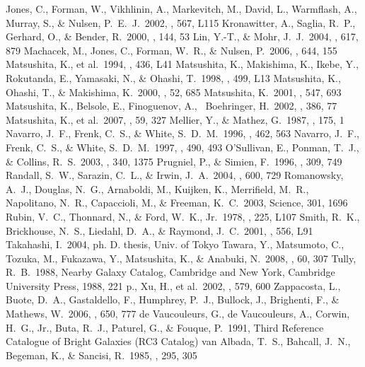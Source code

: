 \documentclass[structabstract]{aa}
\begin{document}
\begin{thebibliography}{}
 Jones, C., Forman, W., Vikhlinin, A., Markevitch, M., David, L., Warmflash, A., Murray, S., \& Nulsen, P.~E.~J.\ 2002, \apjl, 567, L115
 Kronawitter, A., Saglia, R.~P., Gerhard, O., \& Bender, R.\ 2000, \aaps, 144, 53
 Lin, Y.-T., \& Mohr, J.~J.\ 2004, \apj, 617, 879
 Machacek, M., Jones, C., Forman, W.~R., \& Nulsen, P.\ 2006, \apj, 644, 155 
 Matsushita, K., et al.\ 1994, \apjl, 436, L41
 Matsushita, K., Makishima, K., Ikebe, Y., Rokutanda, E., Yamasaki, N., \& Ohashi, T.\ 1998, \apjl, 499, L13
 Matsushita, K., Ohashi, T., \& Makishima, K.\ 2000, \pasj, 52, 685
 Matsushita, K.\ 2001, \apj, 547, 693
 Matsushita, K., Belsole, E., Finoguenov, A., {\ Boe}hringer, H.\ 2002, \aap, 386, 77 
 Matsushita, K., et al.\ 2007, \pasj, 59, 327 
 Mellier, Y., \& Mathez, G.\ 1987, \aap, 175, 1
 Navarro, J.~F., Frenk, C.~S., \& White, S.~D.~M.\ 1996, \apj, 462, 563
 Navarro, J.~F., Frenk, C.~S., \& White, S.~D.~M.\ 1997, \apj, 490, 493
 O'Sullivan, E., Ponman, T.~J., \& Collins, R.~S.\ 2003, \mnras, 340, 1375  
 Prugniel, P., \& Simien, F.\ 1996, \aap, 309, 749
 Randall, S.~W., Sarazin, C.~L., \& Irwin, J.~A.\ 2004, \apj, 600, 729 
 Romanowsky, A.~J., Douglas, N.~G., Arnaboldi, M., Kuijken, K., Merrifield, M.~R., Napolitano, N.~R., Capaccioli, M., \& Freeman, K.~C.\ 2003, Science, 301, 1696
 Rubin, V.~C., Thonnard, N., \& Ford, W.~K., Jr.\ 1978, \apjl, 225, L107
 Smith, R.~K., Brickhouse, N.~S., Liedahl, D.~A., \& Raymond, J.~C.\ 2001, \apjl, 556, L91
 Takahashi, I.\ 2004, ph. D. thesis, Univ. of Tokyo
 Tawara, Y., Matsumoto, C., Tozuka, M., Fukazawa, Y., Matsushita, K., \& Anabuki, N.\ 2008, \pasj, 60, 307 
 Tully, R.~B.\ 1988, Nearby Galaxy Catalog, Cambridge and New York, Cambridge University Press, 1988, 221 p.,
 Xu, H., et al.\ 2002, \apj, 579, 600 
 Zappacosta, L., Buote, D.~A., Gastaldello, F., Humphrey, P.~J., Bullock, J., Brighenti, F., \& Mathews, W.\ 2006, \apj, 650, 777
 de Vaucouleurs, G., de Vaucouleurs, A., Corwin, H.~G., Jr., Buta, R.~J., Paturel, G., \& Fouque, P.\ 1991, Third Reference Catalogue of Bright Galaxies (RC3 Catalog)
 van Albada, T.~S., Bahcall, J.~N., Begeman, K., \& Sancisi, R.\ 1985, \apj, 295, 305
\end{thebibliography}
\end{document}
